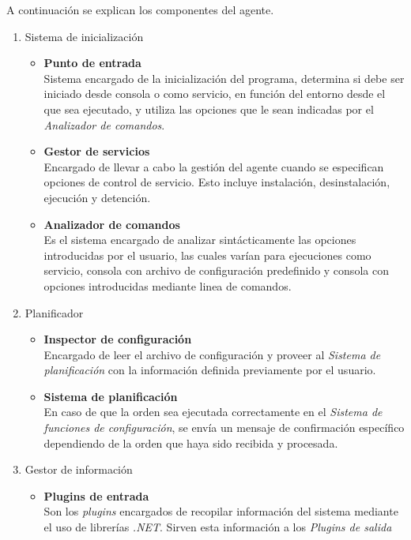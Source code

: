             A continuación se explican los componentes del agente.

            \begin{enumerate}
                \item Sistema de inicialización
                    \begin{itemize}
                        \item \textbf{Punto de entrada} \\
                        Sistema encargado de la inicialización del programa, determina si debe ser iniciado desde consola o como servicio, en función del entorno desde el que sea ejecutado, y utiliza las opciones que le sean indicadas por el \textit{Analizador de comandos}.
                            
                        \item \textbf{Gestor de servicios} \\ 
                        Encargado de llevar a cabo la gestión del agente cuando se especifican opciones de control de servicio. Esto incluye instalación, desinstalación, ejecución y detención.
                            
                        \item \textbf{Analizador de comandos} \\ 
                        Es el sistema encargado de analizar sintácticamente las opciones introducidas por el usuario, las cuales varían para ejecuciones como servicio, consola con archivo de configuración predefinido y consola con opciones introducidas mediante linea de comandos.
                    \end{itemize}
                \item Planificador
                    \begin{itemize}
                        \item \textbf{Inspector de configuración} \\ 
                        Encargado de leer el archivo de configuración y proveer al \textit{Sistema de planificación} con la información definida previamente por el usuario.
                        
                        \item \textbf{Sistema de planificación} \\
                        En caso de que la orden sea ejecutada correctamente en el \textit{Sistema de funciones de configuración}, se envía un mensaje de confirmación específico dependiendo de la orden que haya sido recibida y procesada.
                    \end{itemize}
                \item Gestor de información
                    \begin{itemize}
                        \item \textbf{Plugins de entrada} \\ 
                        Son los \textit{plugins} encargados de recopilar información del sistema mediante el uso de librerías \textit{.NET}. Sirven esta información a los \textit{Plugins de salida}
                            

\end{itemize}
\end{enumerate}
